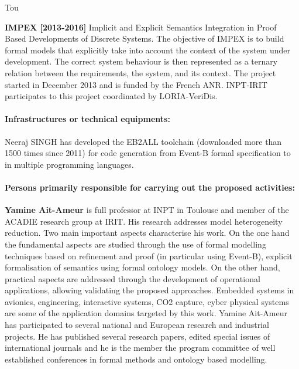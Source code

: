 \begin{sitedescription}{Tou}
\begin{compactitem}
\item \textbf{IMPEX [2013-2016]} Implicit and Explicit Semantics Integration in Proof Based Developments of Discrete Systems. 
The objective of IMPEX is to build formal models that explicitly take into account the context of the system under development. The correct system behaviour is then represented as a ternary relation between the requirements, the system, and its context. The project started in December 2013 and is funded by the French ANR.  INPT-IRIT participates to this project coordinated by LORIA-VeriDis.
 \end{compactitem}

\paragraph*{Infrastructures or technical equipments:}

\begin{compactitem}
\item Neeraj SINGH  has  developed the EB2ALL toolchain (downloaded more than 1500 times since 2011)  for code generation  from Event-B formal specification to in multiple programming languages.
\end{compactitem}

\paragraph*{Persons primarily responsible for carrying out the proposed activities:}

\begin{compactitem} %

\item{\bf   Yamine Ait-Ameur}    is full professor at INPT in Toulouse and member of the ACADIE research group at IRIT. 
 His research addresses model heterogeneity reduction. Two main important aspects characterise his work. On the one hand the fundamental aspects are studied through the use of formal modelling techniques based on refinement and proof (in particular using Event-B), explicit formalisation of semantics using formal ontology models. On the other hand, practical aspects are addressed through the development of operational applications, allowing validating the proposed approaches. Embedded systems in avionics, engineering, interactive systems, CO2 capture, cyber physical systems are some of the application domains targeted by this work.  
Yamine Ait-Ameur has participated to several national and European research and industrial projects.   He has published several research papers, edited special issues of international journals and he is the member the program committee of well established conferences in formal methods and ontology based modelling.


\end{compactitem}
\end{sitedescription}
